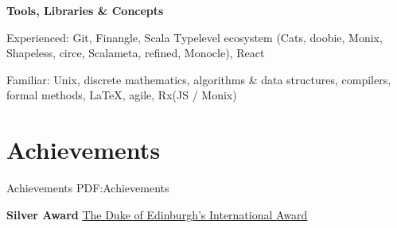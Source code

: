 \documentclass[a4paper,10pt,oneside]{article}
\begin{document}
\begin{body}
\EntryGap

\textbf{Tools, Libraries \& Concepts}
\par Experienced: Git, Finangle, Scala Typelevel ecosystem (Cats, doobie, Monix, Shapeless, circe, Scalameta, refined, Monocle), React
\par Familiar: Unix, discrete mathematics, algorithms \& data structures, compilers, formal methods, \LaTeX, agile, Rx(JS / Monix)



\section
{Achievements}
{Achievements}
{PDF:Achievements}





\textbf{Silver Award}
\href{http://www.dukeofed.com.au/}{The Duke of Edinburgh’s International Award}
\hfill {}
\EntryGap


\end{body}
\end{document}
